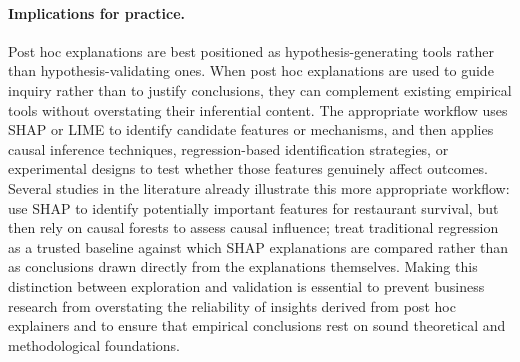 \documentclass[11pt]{article}
\begin{document}
\paragraph{Implications for practice.}
Post hoc explanations are best positioned as hypothesis-generating tools rather than hypothesis-validating ones. When post hoc explanations are used to guide inquiry rather than to justify conclusions, they can complement existing empirical tools without overstating their inferential content. The appropriate workflow uses SHAP or LIME to identify candidate features or mechanisms, and then applies causal inference techniques, regression-based identification strategies, or experimental designs to test whether those features genuinely affect outcomes. Several studies in the literature already illustrate this more appropriate workflow: \citet{zhang2023can} use SHAP to identify potentially important features for restaurant survival, but then rely on causal forests to assess causal influence; \citet{hanauer22boosting} treat traditional regression as a trusted baseline against which SHAP explanations are compared rather than as conclusions drawn directly from the explanations themselves. Making this distinction between exploration and validation is essential to prevent business research from overstating the reliability of insights derived from post hoc explainers and to ensure that empirical conclusions rest on sound theoretical and methodological foundations.
{\small

}
\end{document}
